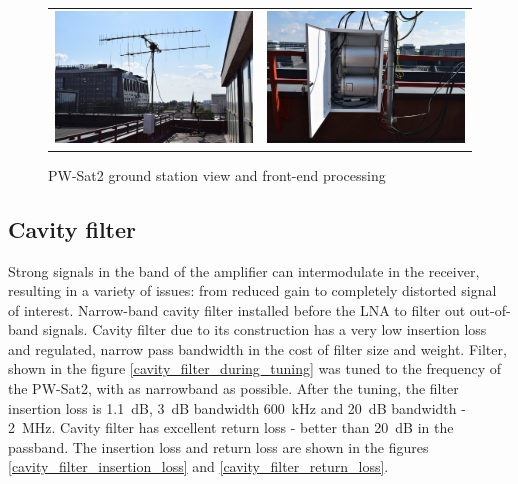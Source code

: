 \begin{figure}[h]
   \centering
\begin{tabular}{cc}
        \includegraphics[width=0.35\paperwidth]{img/7/elka_view.jpg}
    & 
        \includegraphics[width=0.35\paperwidth]{img/7/elka_skrzynka.jpg}
\end{tabular}
\label{elka_skrzynka}
\caption{PW-Sat2 ground station view and front-end processing}
\end{figure}

\subsection{Cavity filter}
Strong signals in the band of the amplifier can intermodulate in the receiver, resulting in a variety of issues: from reduced gain to completely distorted signal of interest. Narrow-band cavity filter installed before the LNA to filter out out-of-band signals. Cavity filter due to its construction has a very low insertion loss and regulated, narrow pass bandwidth in the cost of filter size and weight. Filter, shown in the figure \ref{cavity_filter_during_tuning} was tuned to the frequency of the PW-Sat2, with as narrowband as possible. After the tuning, the filter insertion loss is \SI{1.1}{\dB}, \SI{3}{\dB} bandwidth \SI{600}{\kHz} and \SI{20}{\dB} bandwidth - \SI{2}{\MHz}. Cavity filter has excellent return loss - better than \SI{20}{\dB} in the passband. The insertion loss and return loss are shown in the figures \ref{cavity_filter_insertion_loss} and \ref{cavity_filter_return_loss}.

